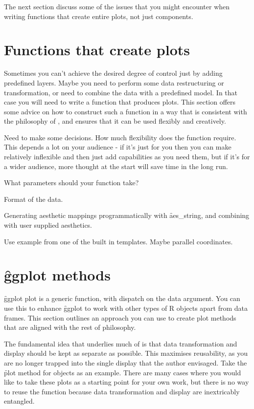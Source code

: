 The next section discuss some of the issues that you might encounter when writing functions that create entire plots, not just components.

\section{Functions that create plots}
\label{sec:functions}

Sometimes you can't achieve the desired degree of control just by adding predefined layers.  Maybe you need to perform some data restructuring or transformation, or need to combine the data with a predefined model.  In that case you will need to write a function that produces \ggplot plots.  This section offers some advice on how to construct such a function in a way that is consistent with the philosophy of \ggplot, and ensures that it can be used flexibly and creatively.

Need to make some decisions.  How much flexibility does the function require.  This depends a lot on your audience - if it's just for you then you can make relatively inflexible and then just add capabilities as you need them, but if it's for a wider audience, more thought at the start will save time in the long run.

What parameters should your function take?

Format of the data.

Generating aesthetic mappings programmatically with \f{aes_string}, and combining with user supplied aesthetics.

Use example from one of the built in templates.  Maybe parallel coordinates.

\section{\f{ggplot} methods}
\label{sec:methods}

\f{ggplot} plot is a generic function, with dispatch on the data argument.  You can use this to enhance \f{ggplot} to work with other types of R objects apart from data frames.  This section outlines an approach you can use to create plot methods that are aligned with the rest of \ggplot philosophy.

The fundamental idea that underlies much of \ggplot is that data transformation and display should be kept as separate as possible.  This maximises reusability, as you are no longer trapped into the single display that the author envisaged.  Take the \f{plot} method for  objects as an example.  There are many cases where you would like to take these plots as a starting point for your own work, but there is no way to reuse the function because data transformation and display are inextricably entangled.

